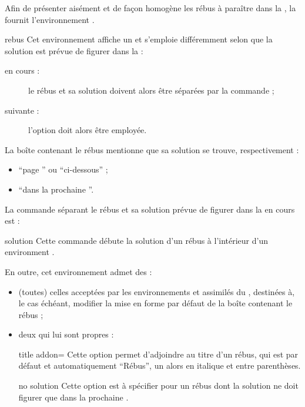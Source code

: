 \documentclass{letgut}
\begin{document}
\tcbstartrecording\relax
Afin de présenter aisément et de façon homogène les rébus à paraître dans la
, la  fournit l'environnement .

\begin{docEnvironment}[doclang/environment content=rébus,doc new={2023-01-14}]{rebus}{}
  Cet environnement affiche un  et s'emploie différemment selon que
  la solution est prévue de figurer dans la  :
  \begin{description}
  \item[en cours :] le rébus et sa solution doivent alors être séparées par
    la commande  ;
  \item[suivante :] l'option  doit alors être employée.
  \end{description}
  La boîte contenant le rébus mentionne que sa solution se trouve,
  respectivement :
  \begin{itemize}
  \item \enquote{page } ou \enquote{ci-dessous} ;
  \item \enquote{dans la prochaine }.
  \end{itemize}

  La commande séparant le rébus et sa solution prévue de figurer dans la
   en cours est :
  \begin{docCommand}[doc new={2023-01-14}]{solution}{}
    Cette commande débute la solution d'un rébus à l'intérieur d'un environment
    .
  \end{docCommand}

  En outre, cet environnement admet des  :
  \begin{itemize}
  \item (toutes) celles acceptées par les environnements  et
    assimilés du , destinées à, le cas échéant, modifier la
    mise en forme par défaut de la boîte contenant le rébus ;
  \item deux qui lui sont propres :
    \begin{docKey}[][doc new={2023-01-14}]{title addon}{=}{\valinitdef}
      Cette option permet d'adjoindre au titre d'un rébus, qui est par défaut et
      automatiquement \enquote{Rébus}, un  alors en italique et
      entre parenthèses.
    \end{docKey}
    \begin{docKey}[][doc new={2023-01-14}]{no solution}{}{}
      Cette option est à spécifier pour un rébus dont la solution ne doit figurer
      que dans la prochaine .
    \end{docKey}
  \end{itemize}
\end{docEnvironment}
\end{document}
